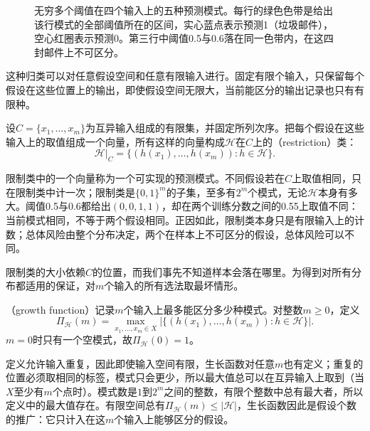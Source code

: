 \begin{figure}[htbp]
  \centering
  
  \caption{无穷多个阈值在四个输入上的五种预测模式。每行的绿色色带是给出该行模式的全部阈值所在的区间，实心蓝点表示预测1（垃圾邮件），空心红圈表示预测0。第三行中阈值0.5与0.6落在同一色带内，在这四封邮件上不可区分。}
  \label{fig:lt5-threshold-four-point-patterns}
\end{figure}

这种归类可以对任意假设空间和任意有限输入进行。固定有限个输入，只保留每个假设在这些位置上的输出，即使假设空间无限大，当前能区分的输出记录也只有有限种。

\begin{definition}[限制类]
\label{def:restriction-class}
设$C=\{x_1,\ldots,x_m\}$为互异输入组成的有限集，并固定所列次序。把每个假设在这些输入上的取值组成一个向量，所有这样的向量构成$\mathcal H$在$C$上的（restriction）类：
\[
 \mathcal H|_C=\{(h(x_1),\ldots,h(x_m)):h\in\mathcal H\}.
\]
\end{definition}

限制类中的一个向量称为一个可实现的预测模式。不同假设若在$C$上取值相同，只在限制类中计一次；限制类是$\{0,1\}^m$的子集，至多有$2^m$个模式，无论$\mathcal H$本身有多大。阈值0.5与0.6都给出$(0,0,1,1)$，却在两个训练分数之间的0.55上取值不同：当前模式相同，不等于两个假设相同。正因如此，限制类本身只是有限输入上的计数；总体风险由整个分布决定，两个在样本上不可区分的假设，总体风险可以不同。

限制类的大小依赖$C$的位置，而我们事先不知道样本会落在哪里。为得到对所有分布都适用的保证，对$m$个输入的所有选法取最坏情形。

\begin{definition}[生长函数]
\label{def:growth-function}
（growth function）记录$m$个输入上最多能区分多少种模式。对整数$m\geq0$，定义
\begin{equation}
 \Pi_{\mathcal H}(m)
 =\max_{x_1,\ldots,x_m\in X}
   \left|\{(h(x_1),\ldots,h(x_m)):h\in\mathcal H\}\right|.
 \label{eq:growth-function}
\end{equation}
$m=0$时只有一个空模式，故$\Pi_{\mathcal H}(0)=1$。
\end{definition}

定义允许输入重复，因此即使输入空间有限，生长函数对任意$m$也有定义；重复的位置必须取相同的标签，模式只会更少，所以最大值总可以在互异输入上取到（当$X$至少有$m$个点时）。模式数是$1$到$2^m$之间的整数，有限个整数中总有最大者，所以定义中的最大值存在。有限空间总有$\Pi_{\mathcal H}(m)\leq|\mathcal H|$，生长函数因此是假设个数的推广：它只计入在这$m$个输入上能够区分的假设。

